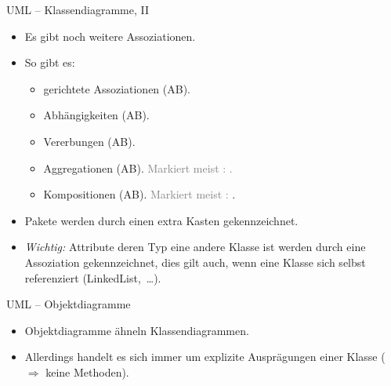 \begin{frame}{UML -- Klassendiagramme, II}
    \begin{itemize}[<+(1)->]
        \widei
        \item Es gibt noch weitere Assoziationen.
        \item So gibt es: \begin{itemize}
            \item gerichtete Assoziationen (A\;\;B).
            \item Abhängigkeiten (A\;\;B).
            \item Vererbungen (A\;\;B).
            \item Aggregationen (A\;\;B).\pause{} \textcolor{gray}{Markiert meist : .}
            \item Kompositionen (A\;\;B).\pause{} \textcolor{gray}{Markiert meist : }.
        \end{itemize}
        \item Pakete werden durch einen extra Kasten gekennzeichnet.
        \item \textit{Wichtig:} Attribute deren Typ eine andere Klasse ist werden durch eine Assoziation gekennzeichnet,\pause{} dies gilt auch, wenn eine Klasse sich selbst referenziert\pause{} (LinkedList,~\ldots).
    \end{itemize}
\end{frame}

\begin{frame}{UML -- Objektdiagramme}
    \hypertarget<1>{uml:object}{}\begin{itemize}[<+(1)->]
        \widei
        \item Objektdiagramme ähneln Klassendiagrammen.
        \item Allerdings handelt es sich immer um explizite Ausprägungen einer Klasse\pause{} (\(\Rightarrow\) keine Methoden).
    \end{itemize}
    \vfill\pause{}
    \begin{center}
    \end{center}\vfill\null
\end{frame}

